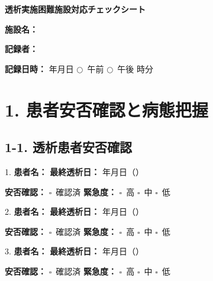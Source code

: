 \documentclass[a4paper,12pt]{jarticle}
\newcommand{\checkbox}{$\square$\ }
\newcommand{\underlinespace}[1]{\underline{\hspace{#1}}}
\newcommand{\circlecheck}{$\bigcirc$\ }
\begin{document}
\begin{center}
{\Large\textbf{透析実施困難施設対応チェックシート}}
\end{center}
\vspace{5mm}

\noindent
\textbf{施設名：} \underlinespace{8cm}

\vspace{3mm}

\noindent
\textbf{記録者：} \underlinespace{4cm}

\vspace{3mm}

\noindent
\textbf{記録日時：} \underlinespace{2cm}年\underlinespace{1cm}月\underlinespace{1cm}日 \quad \circlecheck 午前 \quad \circlecheck 午後 \quad \underlinespace{1cm}時\underlinespace{1cm}分

\vspace{5mm}

\section*{1. 患者安否確認と病態把握}

\subsection*{1-1. 透析患者安否確認}

1. \textbf{患者名：} \underlinespace{3cm} \quad \textbf{最終透析日：} \underlinespace{1.5cm}年\underlinespace{1cm}月\underlinespace{1cm}日（\underlinespace{1cm}）

\quad \textbf{安否確認：} \checkbox 確認済 \quad \textbf{緊急度：} \checkbox 高 \checkbox 中 \checkbox 低

\vspace{4mm}

2. \textbf{患者名：} \underlinespace{3cm} \quad \textbf{最終透析日：} \underlinespace{1.5cm}年\underlinespace{1cm}月\underlinespace{1cm}日（\underlinespace{1cm}）

\quad \textbf{安否確認：} \checkbox 確認済 \quad \textbf{緊急度：} \checkbox 高 \checkbox 中 \checkbox 低

\vspace{4mm}

3. \textbf{患者名：} \underlinespace{3cm} \quad \textbf{最終透析日：} \underlinespace{1.5cm}年\underlinespace{1cm}月\underlinespace{1cm}日（\underlinespace{1cm}）

\quad \textbf{安否確認：} \checkbox 確認済 \quad \textbf{緊急度：} \checkbox 高 \checkbox 中 \checkbox 低
\end{document}
